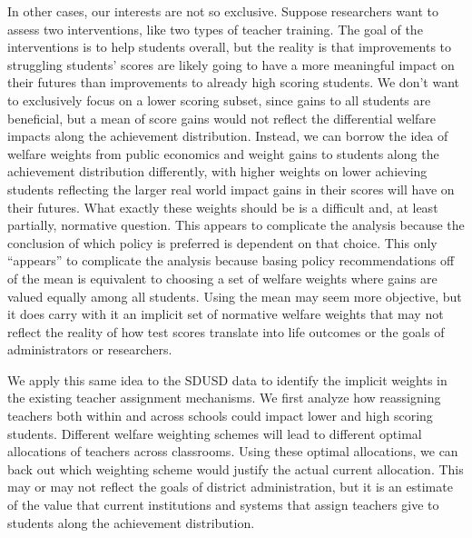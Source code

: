 \documentclass{article}
\theoremstyle{definition}
\theoremstyle{definition}
\theoremstyle{definition}
\begin{document}
In other cases, our interests are not so exclusive. Suppose researchers want to assess two interventions, like two types of teacher training. The goal of the interventions is to help students overall, but the reality is that improvements to struggling students' scores are likely going to have a more meaningful impact on their futures than improvements to already high scoring students. We don’t want to exclusively focus on a lower scoring subset, since gains to all students are beneficial, but a mean of score gains would not reflect the differential welfare impacts along the achievement distribution. Instead, we can borrow the idea of welfare weights from public economics and weight gains to students along the achievement distribution differently, with higher weights on lower achieving students reflecting the larger real world impact gains in their scores will have on their futures. What exactly these weights should be is a difficult and, at least partially, normative question. This appears to complicate the analysis because the conclusion of which policy is preferred is dependent on that choice. This only “appears” to complicate the analysis because basing policy recommendations off of the mean is equivalent to choosing a set of welfare weights where gains are valued equally among all students. Using the mean may seem more objective, but it does carry with it an implicit set of normative welfare weights that may not reflect the reality of how test scores translate into life outcomes or the goals of administrators or researchers. 

We apply this same idea to the SDUSD data to identify the implicit weights in the existing teacher assignment mechanisms. We first analyze how reassigning teachers both within and across schools could impact lower and high scoring students. Different welfare weighting schemes will lead to different optimal allocations of teachers across classrooms. Using these optimal allocations, we can back out which weighting scheme would justify the actual current allocation. This may or may not reflect the goals of district administration, but it is an estimate of the value that current institutions and systems that assign teachers give to students along the achievement distribution. 
\end{document}
